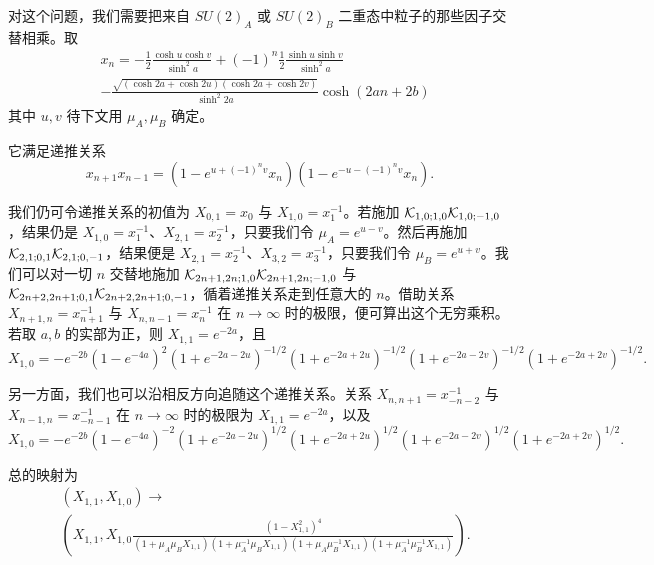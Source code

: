 对这个问题，我们需要把来自 $SU(2)_A$ 或 $SU(2)_B$ 二重态中粒子的那些因子交替相乘。取
\begin{equation} \label{eq:appA-flavor-solution}
\begin{aligned}
& x_n = -\frac{1}{2}\frac{\cosh u \cosh v}{\sinh^2 a} + (-1)^n
\frac{1}{2}\frac{\sinh u \sinh v}{\sinh^2 a}  \\
& - \frac{\sqrt{(\cosh 2
a + \cosh 2 u)(\cosh 2 a + \cosh 2 v)}}{\sinh^2 2 a} \cosh (2 a n +
2 b)
\end{aligned}
\end{equation}
其中 $u,v$ 待下文用 $\mu_A, \mu_B$ 确定。

它满足递推关系
\begin{equation} \label{eq:appA-flavor-recursion}
x_{n+1} x_{n-1} = (1 - e^{u + (-1)^n v} x_n)(1 - e^{-u - (-1)^n v}
x_n).
\end{equation}

我们仍可令递推关系的初值为 $X_{0,1}=x_0$ 与 $X_{1,0}
= x^{-1}_1$。若施加 $\mathcal{K}_{1,0;1,0} \mathcal{K}_{1,0;-1,0}$，结果仍是 $X_{1,0}=x^{-1}_1$、$X_{2,1} =x^{-1}_2$，只要我们令 $\mu_A = e^{u-v}$。然后再施加 $\mathcal{K}_{2,1;0,1}
\mathcal{K}_{2,1;0,-1}$，结果便是 $X_{2,1}=x_2^{-1}$、$X_{3,2}= x^{-1}_3$，只要我们令 $\mu_B = e^{u+v}$。我们可以对一切 $n$ 交替地施加 $\mathcal{K}_{2n+1,2n;1,0} \mathcal{K}_{2n+1,2n;-1,0}$ 与 $\mathcal{K}_{2n+2,2n+1;0,1} \mathcal{K}_{2n+2,2n+1;0,-1}$，循着递推关系走到任意大的 $n$。借助关系 $X_{n+1,n} = x^{-1}_{n+1}$ 与 $X_{n,n-1} = x^{-1}_{n}$ 在 $n\to\infty$ 时的极限，便可算出这个无穷乘积。若取 $a,b$ 的实部为正，则 $X_{1,1} = e^{-2 a}$，且
\begin{equation} \label{eq:appA-flavor-forward}
X_{1,0} =- e^{-2 b} (1-e^{-4 a})^2(1+e^{-2a
-2u})^{-1/2}(1+e^{-2a +2u})^{-1/2}(1+e^{-2a -2v})^{-1/2}(1+e^{-2a
+2v})^{-1/2}.
\end{equation}

另一方面，我们也可以沿相反方向追随这个递推关系。关系 $X_{n,n+1} = x^{-1}_{-n-2}$ 与 $X_{n-1,n} = x^{-1}_{-n-1}$ 在 $n\to\infty$ 时的极限为 $X_{1,1} = e^{-2a}$，以及
\begin{equation} \label{eq:appA-flavor-backward}
X_{1,0} =- e^{-2 b} (1-e^{-4 a})^{-2}(1+e^{-2a
-2u})^{1/2}(1+e^{-2a +2u})^{1/2}(1+e^{-2a -2v})^{1/2}(1+e^{-2a
+2v})^{1/2}.
\end{equation}

总的映射为
\begin{equation} \label{eq:appA-flavor-total}
\begin{aligned}
& (X_{1,1},X_{1,0}) \to  \\
& \left(X_{1,1},X_{1,0} \frac{(1-X_{1,1}^2)^{4}}{(1+ \mu_A \mu_B X_{1,1})(1+ \mu_A^{-1} \mu_B X_{1,1})
(1+ \mu_A \mu_B^{-1}X_{1,1})(1+ \mu_A^{-1} \mu_B^{-1}X_{1,1})}\right).
\end{aligned}
\end{equation}

